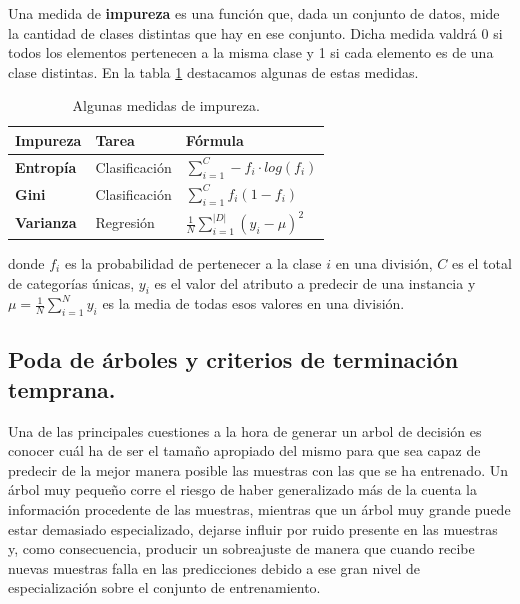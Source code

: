 Una medida de \textbf{impureza} \cite{impurity} es una función que, dada un conjunto de datos, mide la cantidad de clases distintas que hay en ese conjunto. Dicha medida valdrá 0 si todos los elementos pertenecen a la misma clase y 1 si cada elemento es de una clase distintas. En la tabla \ref{tab:entropy} destacamos algunas de estas medidas.\\

\begin{table}[ht]
\centering
\begin{tabular}{|l|l|l|}
\hline
\textbf{Impureza} & \textbf{Tarea} & \textbf{Fórmula}                         \\ \hline
\textbf{Entropía}  & Clasificación  & $\sum_{i=1}^{C}- f_i \cdot log (f_i)$    \\ \hline
\textbf{Gini}      & Clasificación  & $\sum_{i=1}^{C} f_i (1 - f_i)$           \\ \hline
\textbf{Varianza}  & Regresión      & $\frac{1}{N}\sum_{i=1}^|D|(y_i - \mu)^2$ \\ \hline
\end{tabular}
\caption{Algunas medidas de impureza.}
\label{tab:entropy}
\end{table}

donde $f_i$ es la probabilidad de pertenecer a la clase $i$ en una división, $C$ es el total de categorías únicas, $y_i$ es el valor del atributo a predecir de una instancia  y $\mu = \frac{1}{N} \sum_{i=1}^{N}y_i$ es la media de todas esos valores en una división.\\

\subsection{Poda de árboles y criterios de terminación temprana.}
Una de las principales cuestiones a la hora de generar un arbol de decisión es conocer cuál ha de ser el tamaño apropiado del mismo para que sea capaz de predecir de la mejor manera posible las muestras con las que se ha entrenado. Un árbol muy pequeño corre el riesgo de haber generalizado más de la cuenta la información procedente de las muestras, mientras que un árbol muy grande puede estar demasiado especializado, dejarse influir por ruido presente en las muestras y, como consecuencia, producir un sobreajuste de manera que cuando recibe nuevas muestras falla en las predicciones debido a ese gran nivel de especialización sobre el conjunto de entrenamiento. \\

